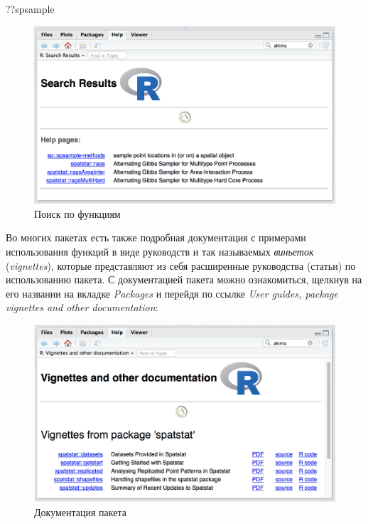 \documentclass[]{book}
\newenvironment{Shaded}{\begin{snugshade}}{\end{snugshade}}
\newcommand{\NormalTok}[1]{#1}
\begin{document}
\begin{Shaded}
\begin{Highlighting}[]
\NormalTok{??spsample}
\end{Highlighting}
\end{Shaded}

\begin{figure}
\centering
\includegraphics{images/ch0_spsample.png}
\caption{Поиск по функциям}
\end{figure}

Во многих пакетах есть также подробная документация с примерами
использования функций в виде руководств и так называемых \emph{виньеток}
(\emph{vignettes}), которые представляют из себя расширенные руководства
(статьи) по использованию пакета. С документацией пакета можно
ознакомиться, щелкнув на его названии на вкладке \emph{Packages} и
перейдя по ссылке \emph{User guides, package vignettes and other
documentation}:

\begin{figure}
\centering
\includegraphics{images/ch0_vignette.png}
\caption{Документация пакета}
\end{figure}
\end{document}
